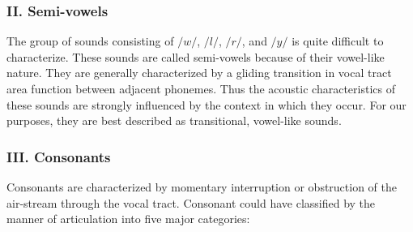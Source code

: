 \documentclass[12pt, a4paper, twoside]{report}
\begin{document}
\subsubsection{II. Semi-vowels}
The group of sounds consisting of $/w/$, $/l/$, $/r/$, and $/y/$ is quite difficult to characterize. These sounds are called semi-vowels because of their vowel-like nature. They are generally characterized by a gliding transition in vocal tract area function between adjacent phonemes. Thus the acoustic characteristics of these sounds are strongly influenced by the context in which they occur. For our purposes, they are best described as transitional, vowel-like sounds.
\subsubsection{III. Consonants}
Consonants are characterized by momentary interruption or obstruction of the air-stream through the vocal tract. Consonant could have classified by the manner of articulation into five major categories:
\end{document}
